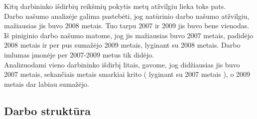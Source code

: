 \documentclass[11pt,a4paper]{article}
\begin{document}
Kitų darbininko išdirbių reikšmių pokytis metų atžvilgiu lieka toks pats.\\

Darbo našumo analizėje galima pastebėti, jog natūrinio darbo našumo atžvilgiu, 
mažiausias jis buvo 2008 metais. Tuo tarpu 2007 ir 2009 jis buvo bene vienodas.
Iš piniginio darbo našumo matome, jog jis mažiausias buvo 2007 metais, padidėjo 
2008 metais ir per pus sumažėjo 2009 metais, lyginant su 2008 metais.
Darbo imlumas įmonėje per 2007-2009 metus tik didėjo.\\

Analizuodami vieno darbininko išdirbį litais, gavome, jog didžiausias jis buvo 
2007 metais, sekančiais metais smarkiai krito ( lyginant su 2007 
metais ), o 2009 metais dar labiau sumažėjo.


\subsection{Darbo struktūra}
\end{document}
